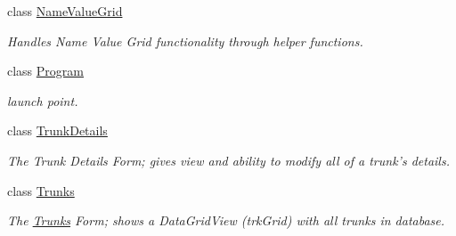 \begin{DoxyCompactItemize}
class \hyperlink{class_ias_pbx_config_1_1_name_value_grid}{NameValueGrid}
\begin{DoxyCompactList}\small\item\em Handles Name Value Grid functionality through helper functions. \item\end{DoxyCompactList}\item 
class \hyperlink{class_ias_pbx_config_1_1_program}{Program}
\begin{DoxyCompactList}\small\item\em launch point. \item\end{DoxyCompactList}\item 
class \hyperlink{class_ias_pbx_config_1_1_trunk_details}{TrunkDetails}
\begin{DoxyCompactList}\small\item\em The Trunk Details Form; gives view and ability to modify all of a trunk's details. \item\end{DoxyCompactList}\item 
class \hyperlink{class_ias_pbx_config_1_1_trunks}{Trunks}
\begin{DoxyCompactList}\small\item\em The \hyperlink{class_ias_pbx_config_1_1_trunks}{Trunks} Form; shows a DataGridView (trkGrid) with all trunks in database. \item\end{DoxyCompactList}\end{DoxyCompactItemize}
